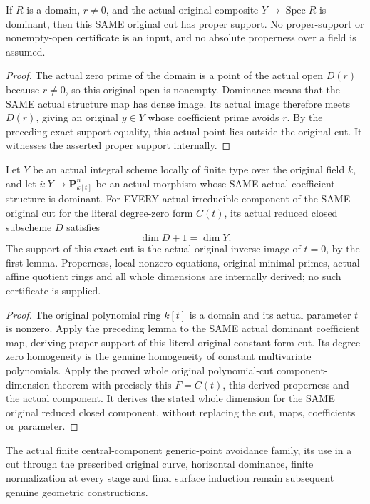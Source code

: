 \begin{lemma}
\label{lem:pl-gauss-original-nonzero-coefficient-cut-proper}
\leanok
If $R$ is a domain, $r\ne0$, and the actual original composite
$Y\to\operatorname{Spec}R$ is dominant, then this SAME original cut
has proper support. No proper-support or nonempty-open certificate is
an input, and no absolute properness over a field is assumed.
\end{lemma}
\begin{proof}
The actual zero prime of the domain is a point of the actual open
$D(r)$ because $r\ne0$, so this original open is nonempty. Dominance
means that the SAME actual structure map has dense image. Its actual
image therefore meets $D(r)$, giving an original $y\in Y$ whose
coefficient prime avoids $r$. By the preceding exact support equality,
this actual point lies outside the original cut. It witnesses the
asserted proper support internally.
\end{proof}

\begin{theorem}
\label{thm:pl-gauss-original-parameter-cut-component-dimension}
\leanok
Let $Y$ be an actual integral scheme locally of finite type over the
original field $k$, and let $i:Y\to\mathbf P^n_{k[t]}$ be an actual
morphism whose SAME actual coefficient structure is dominant. For
EVERY actual irreducible component of the SAME original cut for the
literal degree-zero form $C(t)$, its actual reduced closed subscheme
$D$ satisfies
\[
 \dim D+1=\dim Y.
\]
The support of this exact cut is the actual original inverse image of
$t=0$, by the first lemma. Properness, local nonzero equations, original
minimal primes, actual affine quotient rings and all whole dimensions
are internally derived; no such certificate is supplied.
\end{theorem}
\begin{proof}
The original polynomial ring $k[t]$ is a domain and its actual
parameter $t$ is nonzero. Apply the preceding lemma to the SAME
actual dominant coefficient map, deriving proper support of this
literal original constant-form cut. Its degree-zero homogeneity is
the genuine homogeneity of constant multivariate polynomials. Apply
the proved whole original polynomial-cut component-dimension theorem
with precisely this $F=C(t)$, this derived properness and the actual
component. It derives the stated whole dimension for the SAME
original reduced closed component, without replacing the cut, maps,
coefficients or parameter.
\end{proof}

The actual finite central-component generic-point avoidance family,
its use in a cut through the prescribed original curve, horizontal
dominance, finite normalization at every stage and final surface
induction remain subsequent genuine geometric constructions.

